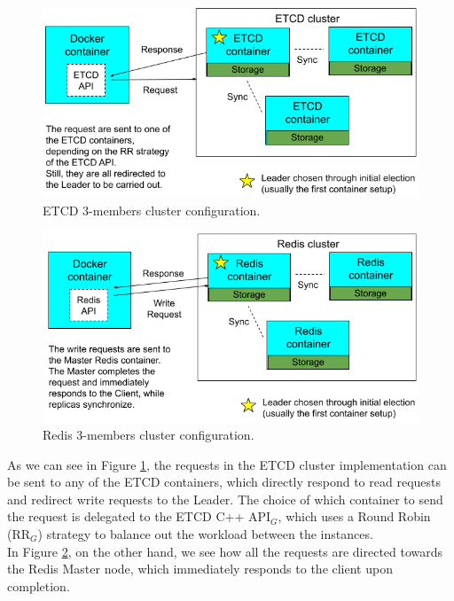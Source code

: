 \begin{figure}[h!]
	\centering
	\includegraphics[width=0.8\linewidth]{"immagini/Software development/ETCD cluster"}
	\caption[ETCD 3-members cluster configuration.]{ETCD 3-members cluster configuration.}
	\label{fig:etcd-cluster}
\end{figure}
\begin{figure}[h!]
	\centering
	\includegraphics[width=0.8\linewidth]{"immagini/Software development/Redis cluster"}
	\caption[Redis 3-members cluster configuration.]{Redis 3-members cluster configuration.}
	\label{fig:redis-cluster}
\end{figure}
As we can see in Figure \ref{fig:etcd-cluster}, the requests in the ETCD cluster implementation can be sent to any of the ETCD containers, which directly respond to read requests and redirect write requests to the Leader. The choice of which container to send the request is delegated to the ETCD C++ API$_G$, which uses a Round Robin (RR$_G$) strategy to balance out the workload between the instances. \\
In Figure \ref{fig:redis-cluster}, on the other hand, we see how all the requests are directed towards the Redis Master node, which immediately responds to the client upon completion.

